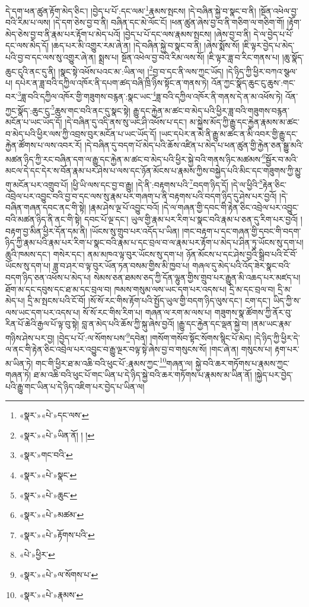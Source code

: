 དེ་དག་ཕན་ཚུན་རྟོག་མེད་ཅིང་། །བྱེད་པ་པོ་:དང་ལམ་\footnote{«སྣར་»«པེ་»དང་ལས་}རྣམས་སྤངས། །དེ་བཞིན་སྐྱེ་བ་སྣང་བ་ནི། །སྔོན་འཕེལ་བྱ་བའི་རིམ་པ་ལས། །དེ་དག་ཅེས་བྱ་བ་ནི། བཞིན་དང་མེ་ལོང་ངོ། །ཕན་ཚུན་ཞེས་བྱ་བ་ནི་གཅིག་ལ་གཅིག་གོ། །རྟོག་མེད་ཅེས་བྱ་བ་ནི་རྣམ་པར་རྟོག་པ་མེད་པའོ། །བྱེད་པ་པོ་དང་ལས་རྣམས་སྤངས། །ཞེས་བྱ་བ་ནི། དེ་ལ་བྱེད་པ་པོ་དང་ལས་མེད་དོ། །ཆད་པར་མི་འགྱུར་རམ་ཞེ་ན། །དེ་བཞིན་སྐྱེ་བ་སྣང་བ་ནི། །ཞེས་སྨོས་སོ། །ཇི་ལྟར་བྱེད་པ་མེད་པའི་བྱ་བ་དང་ལས་སུ་འགྱུར་ཞེ་ན། སྨྲས་པ། སྔོན་འཕེལ་བྱ་བའི་རིམ་ལས་སོ། །ཇི་ལྟར་ཟླ་བ་རིང་གནས་པ། །ཆུ་སྣོད་ཆུང་ངུའི་ནང་དུ་ནི། །སྣང་སྟེ་འཕོས་པའང་མ་:ཡིན་ལ། །\footnote{«སྣར་»«པེ་»ཡིན་ནོ། ། །}བྱ་བ་དང་ནི་ལས་ཀྱང་ཡོད། །དེ་ཉིད་ཀྱི་ཕྱིར་བཀའ་སྩལ་པ། དཔེར་ན་ཟླ་བའི་དཀྱིལ་འཁོར་ནི་དཔག་ཚད་བཞི་ཁྲི་ཉིས་སྟོང་ན་གནས་ཏེ། འོན་ཀྱང་སྣོད་ཆུང་ངུ་ཆུས་:གང་བར་\footnote{«སྣར་»གང་བའི་}ཟླ་བའི་དཀྱིལ་འཁོར་གྱི་གཟུགས་བརྙན་:སྣང་ཡང་\footnote{«སྣར་»«པེ་»སྣང་}ཟླ་བའི་དཀྱིལ་འཁོར་ནི་གནས་དེ་ན་མ་འཕོས་ཏེ། འོན་ཀྱང་སྣོད་:ཆུང་ངུ་\footnote{«སྣར་»«པེ་»ཆུང་}ཆུས་གང་བའི་ནང་དུ་སྣང་སྟེ། རྒྱུ་དང་རྐྱེན་མ་ཚང་བ་མེད་པའི་ཕྱིར་ཟླ་བའི་གཟུགས་བརྙན་མངོན་པ་ཡང་ཡོད་དོ། །དེ་བཞིན་དུ་འདི་ནས་སུ་ཡང་ཤི་འཕོས་པ་དང་། མ་སྐྱེས་མོད་ཀྱི་རྒྱུ་དང་རྐྱེན་རྣམས་མ་ཚང་བ་མེད་པའི་ཕྱིར་ལས་ཀྱི་འབྲས་བུར་མངོན་པ་ཡང་ཡོད་དོ། །ཡང་དཔེར་ན་མེ་ནི་རྒྱུ་མ་ཚང་ན་མི་འབར་གྱི་རྒྱུ་དང་རྐྱེན་ཚོགས་པ་ལས་འབར་རོ། །དེ་བཞིན་དུ་བདག་པོ་མེད་པའི་ཆོས་འཛིན་པ་མེད་པ་ཕན་ཚུན་གྱི་རྐྱེན་ཅན་སྒྱུ་མའི་མཚན་ཉིད་ཀྱི་རང་བཞིན་དག་ལ་རྒྱུ་དང་རྐྱེན་མ་ཚང་བ་མེད་པའི་ཕྱིར་སྐྱེ་བའི་གནས་ཉིང་མཚམས་\footnote{«སྣར་»«པེ་»མཚམ་}སྦྱོར་བ་མའི་མངལ་དེ་དང་དེར་ས་བོན་རྣམ་པར་ཤེས་པ་ལས་དང་ཉོན་མོངས་པ་རྣམས་ཀྱིས་བསྐྱེད་པའི་མིང་དང་གཟུགས་ཀྱི་མྱུ་གུ་མངོན་པར་འགྲུབ་པོ། །ཕྱི་ཡི་ལས་དང་བྱ་བ་རྒྱུ། །དེ་ནི་:བརྟགས་པའི་\footnote{«སྣར་»«པེ་»རྟོགས་པའི་}བདག་ཉིད་དོ། །དེ་ལ་ཕྱིའི་\footnote{«པེ་»ཕྱིར་}རྟེན་ཅིང་འབྲེལ་པར་འབྱུང་བའི་བྱ་བ་དང་ལས་སུ་རྣམ་པར་གཞག་པ་ནི་བརྟགས་པའི་བདག་ཉིད་དུ་ཤེས་པར་བྱའོ། །དེ་བཞིན་གཞན་དབང་ནང་གི་སྟེ། །རྣམ་ཤེས་ལྔ་པོ་འབྱུང་བའོ། །དེ་ལ་གཞན་གྱི་དབང་གི་རྟེན་ཅིང་འབྲེལ་པར་འབྱུང་བའི་མཚན་ཉིད་ནི་ནང་གི་སྟེ། དབང་པོ་ལྔ་དང་། ཡུལ་གྱི་རྣམ་པར་རིག་པ་སྣང་བའི་རྣམ་པ་ཅན་དུ་རིག་པར་བྱའོ། །བརྟག་བྱ་མིན་ཕྱིར་དོན་དམ་ནི། །ཡོངས་སུ་གྲུབ་པར་འདོད་པ་ཡིན། །གང་བརྟག་པ་དང་གཞན་གྱི་དབང་གི་བདག་ཉིད་ཀྱི་རྣམ་པའི་རྣམ་པར་རིག་པ་སྣང་བའི་རྣམ་པ་དང་བྲལ་བ་ལ་རྣམ་པར་རྟོག་པ་མེད་པ་ཤིན་ཏུ་ཡོངས་སུ་དག་པ། ཆུའི་ཁམས་དང་། གསེར་དང་། ནམ་མཁའ་ལྟ་བུར་ཡོངས་སུ་དག་པ། ཉོན་མོངས་པ་དང་ཤེས་བྱའི་སྒྲིབ་པའི་ངོ་བོ་ཡོངས་སུ་དག་པ། ཟླ་བ་ཤར་བ་ལྟ་བུར་ཡོན་ཏན་བསམ་གྱིས་མི་ཁྱབ་པ། གཞལ་དུ་མེད་པའི་འོད་ཟེར་སྣང་བའི་བདག་ཉིད་ཅན་འཕོས་པ་མེད་པ། སེམས་ཅན་ཐམས་ཅད་ཀྱི་དོན་ལྷུན་གྱིས་གྲུབ་པར་རྒྱུན་མི་འཆད་པར་མཛད་པ། ཐོག་མ་དང་དབུས་དང་ཐ་མ་དང་བྲལ་བ། ཁམས་གསུམ་ལས་ཡང་དག་པར་འདས་པ། དྲི་མ་དང་བྲལ་བ། དྲི་མ་མེད་པ། དྲི་མ་སྤངས་པའི་ངོ་བོ། །སོ་སོ་རང་གིས་རྟོག་པའི་སྤྱོད་ཡུལ་གྱི་བདག་ཉིད་ལུས་དང་། ངག་དང་། ཡིད་ཀྱི་ས་ལས་ཡང་དག་པར་འདས་པ། སོ་སོ་རང་གིས་རིག་པ། གཞན་ལ་རག་མ་ལས་པ། གཟུགས་སྣ་ཚོགས་ཀྱི་ནོར་བུ་རིན་པོ་ཆེའི་རྒྱལ་པོ་ལྟ་བུ་སྟེ། བླ་ན་མེད་པའི་ཆོས་ཀྱི་སྐུ་ཞེས་བྱའོ། །རྒྱུ་དང་རྐྱེན་དང་ལྡན་སྐྱེ་བ། །ནམ་ཡང་རྣམ་གཉིས་ཤེས་པར་བྱ། །བྱེད་པ་པོ་:ལ་སོགས་པས་\footnote{«སྣར་»«པེ་»ལ་སོགས་པ་}དབེན། །གསོག་གསོབ་སྟོང་སོགས་སྙིང་པོ་མེད། །དེ་ཉིད་ཀྱི་ཕྱིར་དེ་ལ་ནང་གི་རྟེན་ཅིང་འབྲེལ་པར་འབྱུང་བ་རྒྱུ་ལྔར་བལྟ་སྟེ་ཞེས་བྱ་བ་གསུངས་སོ། །གང་ཞེ་ན། གསུངས་པ། རྟག་པར་མ་ཡིན་ཏེ། གང་གི་ཕྱིར་ཐ་མ་འཆི་བའི་ཕུང་པོ་:རྣམས་ཀྱང་\footnote{«སྣར་»«པེ་»རྣམས་}གཞན་ལ། སྐྱེ་བའི་ཆར་གཏོགས་པ་རྣམས་ཀྱང་གཞན་ཏེ། ཐ་མ་འཆི་བའི་ཕུང་པོ་གང་ཡིན་པ་དེ་ཉིད་སྐྱེ་བའི་ཆར་གཏོགས་པ་རྣམས་མ་ཡིན་ནོ། །སྐྱེད་པར་བྱེད་པའི་རྒྱུ་གང་ཡིན་པ་དེ་ཉིད་འཇིག་པར་བྱེད་པ་ཡིན་ལ། 